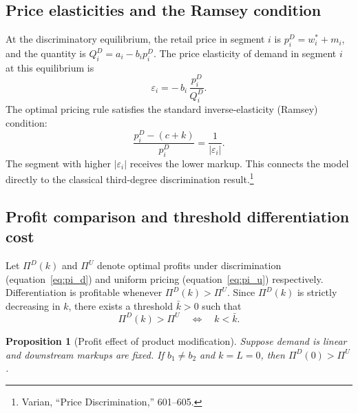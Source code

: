 \documentclass[12pt]{article}
\newtheorem{proposition}{Proposition}
\theoremstyle{definition}
\begin{document}
\subsection{Price elasticities and the Ramsey condition}

At the discriminatory equilibrium, the retail price in segment $i$ is $p_i^D = w_i^* + m_i$, and the quantity is $Q_i^D = a_i - b_i p_i^D$.
The price elasticity of demand in segment $i$ at this equilibrium is
\begin{equation}\label{eq:elasticity}
\varepsilon_i = -\,b_i\,\frac{p_i^D}{Q_i^D}.
\end{equation}
The optimal pricing rule satisfies the standard inverse-elasticity (Ramsey) condition:
\begin{equation}\label{eq:ramsey}
\frac{p_i^D - (c+k)}{p_i^D} = \frac{1}{|\varepsilon_i|}.
\end{equation}
The segment with higher $|\varepsilon_i|$ receives the lower markup. This connects the model directly to the classical third-degree discrimination result.\footnote{Varian, ``Price Discrimination,'' 601--605.}

\subsection{Profit comparison and threshold differentiation cost}

Let $\Pi^D(k)$ and $\Pi^U$ denote optimal profits under discrimination (equation~\ref{eq:pi_d}) and uniform pricing (equation~\ref{eq:pi_u}) respectively.
Differentiation is profitable whenever $\Pi^D(k) > \Pi^U$.
Since $\Pi^D(k)$ is strictly decreasing in $k$, there exists a threshold $\bar{k} > 0$ such that
\begin{equation}\label{eq:threshold}
\Pi^D(k) > \Pi^U \quad\Longleftrightarrow\quad k < \bar{k}.
\end{equation}

\begin{proposition}[Profit effect of product modification]\label{prop:profit}
Suppose demand is linear and downstream markups are fixed.
If $b_1 \ne b_2$ and $k = L = 0$, then $\Pi^D(0) > \Pi^U$.
\end{proposition}
\end{document}
